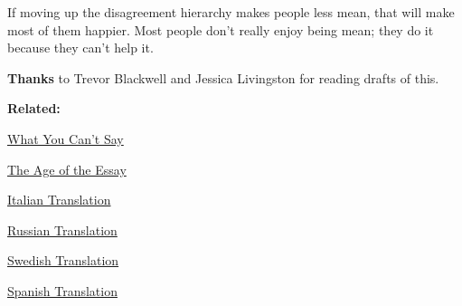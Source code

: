 If moving up the disagreement hierarchy makes
                  people less mean, that will make most of them happier. Most
                  people don't really enjoy being mean; they do it because they
                  can't help it.






                  \textbf{Thanks} to Trevor Blackwell and Jessica Livingston for
                  reading drafts of this.



\textbf{Related:}


              
            
          

            
              
            
            
              
                \href{http://www.paulgraham.com/say.html}{What You Can't Say}

              
              
              
                \href{http://www.paulgraham.com/essay.html}{The Age of the Essay}

              
            
            
              
            
            
              
            
            
              
                \href{http://archivio.internazionale.it/le-parole-giuste-per-essere-in-disaccordo}{Italian Translation}

              
              
              
                \href{http://ryba4.com/translations/disagree}{Russian Translation}

              
            
            
              
            
            
              
            
            
              
                \href{http://kyrkansframtid.se/2008/07/hur-man-ar-oense/}{Swedish Translation}

              
              
              
                \href{http://eldiabloenlosdetalles.net/2008/08/07/como-estar-en-desacuerdo/}{Spanish Translation}

